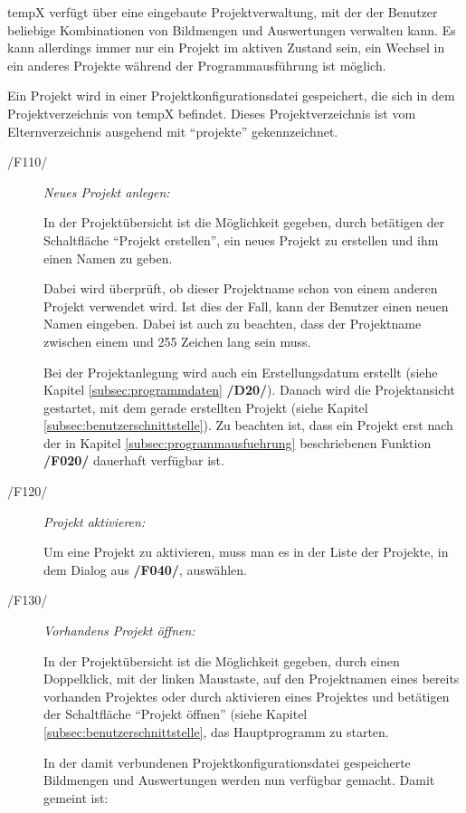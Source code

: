 \label{subsec:projektmanagement}
	
	\gls{tempX} verfügt über eine eingebaute Projektverwaltung, mit der der Benutzer beliebige Kombinationen von Bildmengen und Auswertungen verwalten kann. Es kann allerdings immer nur ein Projekt im aktiven Zustand sein, ein Wechsel in ein anderes Projekte während der Programmausführung ist möglich.\par Ein Projekt wird in einer Projektkonfigurationsdatei gespeichert, die sich in dem Projektverzeichnis von \gls{tempX} befindet. Dieses Projektverzeichnis ist vom Elternverzeichnis ausgehend mit "`projekte"' gekennzeichnet.
	
	\begin{description}		
		
		\item[/F110/] \textit{Neues Projekt anlegen:}\par In der Projektübersicht ist die Möglichkeit gegeben, durch betätigen der Schaltfläche "`Projekt erstellen"', ein neues Projekt zu erstellen und ihm einen Namen zu geben.\par Dabei wird überprüft, ob dieser Projektname schon von einem anderen Projekt verwendet wird. Ist dies der Fall, kann der Benutzer einen neuen Namen eingeben. Dabei ist auch zu beachten, dass der Projektname zwischen einem und 255 Zeichen lang sein muss.\par Bei der Projektanlegung wird auch ein Erstellungsdatum erstellt (siehe Kapitel \ref{subsec:programmdaten} \textbf{/D20/}). Danach wird die Projektansicht gestartet, mit dem gerade erstellten Projekt (siehe Kapitel \ref{subsec:benutzerschnittstelle}). Zu beachten ist, dass ein Projekt erst nach der in Kapitel \ref{subsec:programmausfuehrung} beschriebenen Funktion \textbf{/F020/} dauerhaft verfügbar ist. 
		
		\item[/F120/] \textit{Projekt aktivieren:}\par Um eine Projekt zu aktivieren, muss man es in der Liste der Projekte, in dem Dialog aus \textbf{/F040/}, auswählen.
		
		\item[/F130/] \textit{Vorhandens Projekt öffnen:}\par In der Projektübersicht ist die Möglichkeit gegeben, durch einen Doppelklick, mit der linken Maustaste, auf den Projektnamen eines bereits vorhanden Projektes oder durch aktivieren eines Projektes und betätigen der Schaltfläche "`Projekt öffnen"' (siehe Kapitel \ref{subsec:benutzerschnittstelle}, das Hauptprogramm zu starten.\par In der damit verbundenen Projektkonfigurationsdatei gespeicherte Bildmengen und Auswertungen werden nun verfügbar gemacht. Damit gemeint ist: 
			

\end{description}
